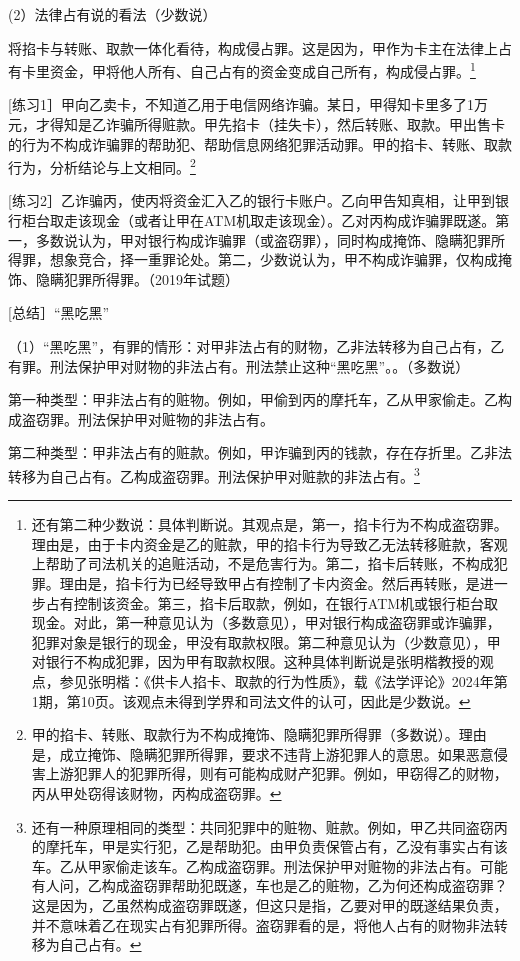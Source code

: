 (2）法律占有说的看法（少数说）

将掐卡与转账、取款一体化看待，构成侵占罪。这是因为，甲作为卡主在法律上占有卡里资金，甲将他人所有、自己占有的资金变成自己所有，构成侵占罪。\footnote{还有第二种少数说：具体判断说。其观点是，第一，掐卡行为不构成盗窃罪。理由是，由于卡内资金是乙的赃款，甲的掐卡行为导致乙无法转移赃款，客观上帮助了司法机关的追赃活动，不是危害行为。第二，掐卡后转账，不构成犯罪。理由是，掐卡行为已经导致甲占有控制了卡内资金。然后再转账，是进一步占有控制该资金。第三，掐卡后取款，例如，在银行ATM机或银行柜台取现金。对此，第一种意见认为（多数意见），甲对银行构成盗窃罪或诈骗罪，犯罪对象是银行的现金，甲没有取款权限。第二种意见认为（少数意见），甲对银行不构成犯罪，因为甲有取款权限。这种具体判断说是张明楷教授的观点，参见张明楷：《供卡人掐卡、取款的行为性质》，载《法学评论》2024年第1期，第10页。该观点未得到学界和司法文件的认可，因此是少数说。}

[练习1］甲向乙卖卡，不知道乙用于电信网络诈骗。某日，甲得知卡里多了1万元，才得知是乙诈骗所得赃款。甲先掐卡（挂失卡），然后转账、取款。甲出售卡的行为不构成诈骗罪的帮助犯、帮助信息网络犯罪活动罪。甲的掐卡、转账、取款行为，分析结论与上文相同。\footnote{甲的掐卡、转账、取款行为不构成掩饰、隐瞒犯罪所得罪（多数说）。理由是，成立掩饰、隐瞒犯罪所得罪，要求不违背上游犯罪人的意思。如果恶意侵害上游犯罪人的犯罪所得，则有可能构成财产犯罪。例如，甲窃得乙的财物，丙从甲处窃得该财物，丙构成盗窃罪。}

[练习2］乙诈骗丙，使丙将资金汇入乙的银行卡账户。乙向甲告知真相，让甲到银行柜台取走该现金（或者让甲在ATM机取走该现金）。乙对丙构成诈骗罪既遂。第一，多数说认为，甲对银行构成诈骗罪（或盗窃罪），同时构成掩饰、隐瞒犯罪所得罪，想象竞合，择一重罪论处。第二，少数说认为，甲不构成诈骗罪，仅构成掩饰、隐瞒犯罪所得罪。（2019年试题）


[总结］“黑吃黑”

（1）“黑吃黑”，有罪的情形：对甲非法占有的财物，乙非法转移为自己占有，乙有罪。刑法保护甲对财物的非法占有。刑法禁止这种“黑吃黑”。。（多数说）

第一种类型：甲非法占有的赃物。例如，甲偷到丙的摩托车，乙从甲家偷走。乙构成盗窃罪。刑法保护甲对赃物的非法占有。

第二种类型：甲非法占有的赃款。例如，甲诈骗到丙的钱款，存在存折里。乙非法转移为自己占有。乙构成盗窃罪。刑法保护甲对赃款的非法占有。\footnote{还有一种原理相同的类型：共同犯罪中的赃物、赃款。例如，甲乙共同盗窃丙的摩托车，甲是实行犯，乙是帮助犯。由甲负责保管占有，乙没有事实占有该车。乙从甲家偷走该车。乙构成盗窃罪。刑法保护甲对赃物的非法占有。可能有人问，乙构成盗窃罪帮助犯既遂，车也是乙的赃物，乙为何还构成盗窃罪？这是因为，乙虽然构成盗窃罪既遂，但这只是指，乙要对甲的既遂结果负责，并不意味着乙在现实占有犯罪所得。盗窃罪看的是，将他人占有的财物非法转移为自己占有。}

